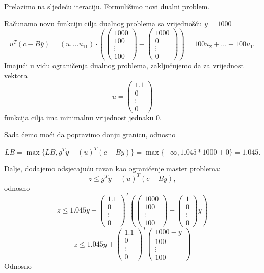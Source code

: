 \documentclass[b5paper, utf8, 11pt, colorlinks]{book}
\theoremstyle{definition}
\begin{document}
 Prelazimo na sljedeću iteraciju. Formulišimo novi dualni problem.
 
  Računamo novu funkciju cilja dualnog problema sa vrijednošću $\overline{y}=1000$
 $$
 u^T (c-B\overline{y})=(u_1\ldots u_{11})\cdot \left(\left(\begin{array}{c}
 	1000 \\
 	100 \\
 	\vdots \\
 	100
 \end{array}\right)-\left(\begin{array}{c}
 	1000 \\
 	0 \\
 	\vdots \\
 	0
 \end{array}\right)\right) = 100u_2+\ldots+100u_{11}
 $$
 Imajući u vidu ograničenja dualnog problema, zaključujemo da za vrijednost vektora $$u=\left(\begin{array}{c}
 	1.1 \\
 	0 \\
 	\vdots \\
 	0
 \end{array}\right)$$
funkcija cilja ima minimalnu vrijednost jednaku 0.

Sada ćemo moći da popravimo donju granicu, odnosno

$$LB = \max\{LB,g^Ty+(u)^T(c-By)\}=\max\{-\infty,1.045*1000+0\} = 1.045.$$

Dalje, dodajemo odsjecajuću ravan kao ograničenje master problema:
$$z\leqslant g^Ty+(u)^T(c-By),$$ 
odnosno
$$z\leqslant 1.045y+\left(\begin{array}{c}
	1.1 \\
	0 \\
	\vdots \\
	0
\end{array}\right)^T
\left(\left(\begin{array}{c}
	1000 \\
	100 \\
	\vdots \\
	100
\end{array}\right)-\left(\begin{array}{c}
1 \\
0 \\
\vdots \\
0
\end{array}\right)y\right)$$
$$z\leqslant 1.045y+\left(\begin{array}{c}
	1.1 \\
	0 \\
	\vdots \\
	0
\end{array}\right)^T
\left(\begin{array}{c}
	1000-y \\
	100 \\
	\vdots \\
	100
\end{array}\right)$$
Odnosno
\end{document}
